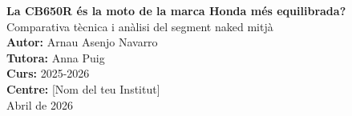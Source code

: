 \documentclass[12pt,a4paper]{article}
\begin{document}
\begin{titlepage}
    \centering
    \vspace*{2cm}
    {\Huge \color{MidnightBlue} \textbf{La CB650R és la moto de la marca Honda més equilibrada?}} \\
    \vspace{1cm}
    {\Large \color{gray} Comparativa tècnica i anàlisi del segment naked mitjà} \\
    \vspace{2cm}
    \vfill
    {\large \textbf{Autor:} Arnau Asenjo Navarro} \\
    {\large \textbf{Tutora:} Anna Puig} \\
    {\large \textbf{Curs:} 2025-2026} \\
    \vspace{1cm}
    {\large \textbf{Centre:} [Nom del teu Institut]} \\
    \vspace{1cm}
    {\large Abril de 2026}
\end{titlepage}


\newpage
\tableofcontents
\newpage



\newpage

\end{document}
